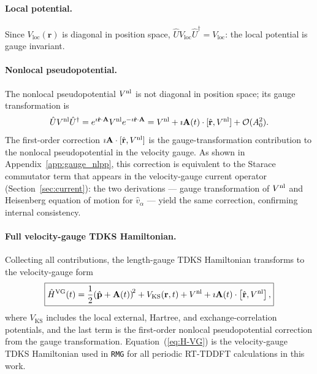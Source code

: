 \paragraph{Local potential.}
Since $V_\mathrm{loc}(\mathbf{r})$ is diagonal in position space,
$\hat{U}V_\mathrm{loc}\hat{U}^\dagger = V_\mathrm{loc}$:
the local potential is gauge invariant.

\paragraph{Nonlocal pseudopotential.}
The nonlocal pseudopotential $V^{\mathrm{nl}}$ is not diagonal in position
space; its gauge transformation is
\begin{equation}
  \hat{U}V^{\mathrm{nl}}\hat{U}^\dagger
  = e^{\imath\hat{\mathbf{r}}\cdot\mathbf{A}}V^{\mathrm{nl}}
    e^{-\imath\hat{\mathbf{r}}\cdot\mathbf{A}}
  = V^{\mathrm{nl}} + \imath\mathbf{A}(t)\cdot[\hat{\mathbf{r}},V^{\mathrm{nl}}]
    + \mathcal{O}(A_0^2).
  \label{eq:U-Vnl-Udag}
\end{equation}
The first-order correction $\imath\mathbf{A}\cdot[\hat{\mathbf{r}},V^{\mathrm{nl}}]$
is the gauge-transformation contribution to the nonlocal
pseudopotential in the velocity gauge.
As shown in Appendix~\ref{app:gauge_nlpp}, this correction is
equivalent to the Starace commutator term that appears in the
velocity-gauge current operator (Section~\ref{sec:current}):
the two derivations --- gauge transformation of $V^{\mathrm{nl}}$ and
Heisenberg equation of motion for $\hat{v}_\alpha$ --- yield the
same correction, confirming internal
consistency.\cite{starace-1971,Mattiat-Luber-2022}

\paragraph{Full velocity-gauge TDKS Hamiltonian.}
Collecting all contributions, the length-gauge TDKS Hamiltonian
transforms to the velocity-gauge form
\begin{equation}
  \boxed{
  \hat{H}^\mathrm{VG}(t)
  = \frac{1}{2}\!\left(\hat{\mathbf{p}} + \mathbf{A}(t)\right)^{\!2}
  + V_\mathrm{KS}(\mathbf{r},t)
  + V^{\mathrm{nl}}
  + \imath\mathbf{A}(t)\cdot\left[\hat{\mathbf{r}},V^{\mathrm{nl}}\right],
  }
  \label{eq:H-VG}
\end{equation}
where $V_\mathrm{KS}$ includes the local external, Hartree, and
exchange-correlation potentials, and the last term is the
first-order nonlocal pseudopotential correction from the gauge
transformation.
Equation~(\ref{eq:H-VG}) is the velocity-gauge TDKS Hamiltonian
used in \texttt{RMG} for all periodic RT-TDDFT calculations in this
work.\cite{Mattiat-Luber-2022,pickard-mauri-2001}

